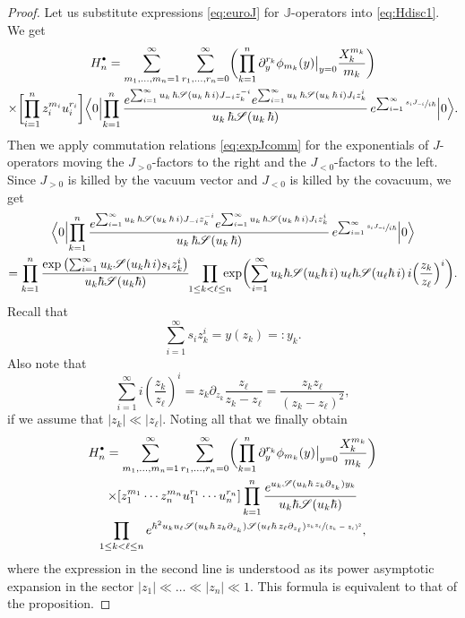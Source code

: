 \documentclass[JEP,XML,SOM,Unicode,NoEqCountersInSection,NoFloatCountersInSection]{cedram}
\let\mathcal\mathscr
\newcommand{\sbullet}{{\scriptscriptstyle\bullet}}
\newcommand{\csbullet}{{\raisebox{1pt}{$\sbullet$}}}
\theoremstyle{plain}
\theoremstyle{definition}
\theoremstyle{remark}
\newcommand{\cS}{\mathcal{S}}
\newcommand{\BVEV}[1]{{\Bigl\langle 0 \Big| {#1} \Big| 0 \Bigr\rangle}}
\newcommand{\Hd}{H^\csbullet}
\newcommand{\euro}{\mathbb{J}}
\begin{document}
\begin{proof}
Let us substitute expressions \eqref{eq:euroJ} for $\euro$-operators into \eqref{eq:Hdisc1}. We get
\begin{multline*}
\Hd_n=\sum_{m_1,\dots,m_n=1}^\infty
\sum_{r_1,\dots,r_n=0}^\infty
\biggl(\prod_{k=1}^n\partial_y^{r_k}\phi_{m_k}(y)\big|_{y=0}\frac{X_k^{m_k}}{m_k}\biggr)
\\
\times\biggl[\prod_{i=1}^n z_i^{m_i}u_i^{r_i}\biggr]
\BVEV{\prod_{k=1}^n\dfrac{
e^{\sum_{i=1}^\infty u_k\,\hbar\cS(u_k\,\hbar\,i) J_{-i}z_k^{-i}}
e^{\sum_{i=1}^\infty u_k\,\hbar \cS(u_k\,\hbar\,i) J_{i}z_k^{i}}}
{u_k\,\hbar\cS(u_k\,\hbar)}\,
e^{\sum_{i=1}^\infty \sfrac{s_i J_{-i}}{i\hbar} }
}.
\end{multline*}
Then we apply commutation relations \eqref{eq:expJcomm} for the exponentials of $J$-operators moving the $J_{>0}$-factors to the right and the $J_{<0}$-factors to the left. Since $J_{>0}$ is killed by the vacuum vector and $J_{<0}$ is killed by the covacuum, we get
\begin{multline*}
\BVEV{\prod_{k=1}^n\dfrac{
e^{\sum_{i=1}^\infty u_k\,\hbar\cS(u_k\,\hbar\,i) J_{-i}z_k^{-i}}
e^{\sum_{i=1}^\infty u_k\,\hbar \cS(u_k\,\hbar\,i) J_{i}z_k^{i}}}
{u_k\,\hbar\cS(u_k\,\hbar)}\,
e^{\sum_{i=1}^\infty \sfrac{s_i J_{-i}}{i\hbar} }}
\\
= \prod_{k=1}^n \dfrac{\exp\left(\sum_{i=1}^\infty u_k\cS(u_k\hbar\,i)s_iz_k^i \right)}
{u_k\hbar\cS(u_k\hbar)}\hspace*{-1mm}
\prod_{1\le k<\ell\le n}\hspace*{-3mm}
\exp\biggl(\sum_{i=1}^\infty u_k\hbar\cS(u_k\hbar\,i)\,u_\ell\hbar\cS(u_\ell\hbar\,i)
\,i\Bigl(\dfrac{z_k}{z_\ell}\Bigr)^i \biggr).
\end{multline*}
Recall that
\[
\sum_{i=1}^\infty s_i z_k^i=y(z_k)=:y_k.
\]
Also note that
\[
\label{eq:bergexp}
\sum_{i=1}^\infty i\left(\dfrac{z_k}{z_\ell}\right)^i
=z_k\partial_{z_k}\frac{z_\ell}{z_k-z_\ell}=\frac{z_kz_\ell}{(z_k-z_\ell)^2},
\]
if we assume that $|z_k| \ll |z_\ell|$. Noting all that we finally obtain
\begin{multline*}
\Hd_n=\sum_{m_1,\dots,m_n=1}^\infty
\sum_{r_1,\dots,r_n=0}^\infty
\biggl(\prod_{k=1}^n\partial_y^{r_k}\phi_{m_k}(y)\big|_{y=0}\frac{X_k^{m_k}}{m_k}\biggr)\\
\times[z_1^{m_1}\cdots z_n^{m_n}u_1^{r_1}\cdots u_n^{r_n}]
\prod_{k=1}^n \frac{e^{ u_k\cS(u_k\hbar\,z_k\partial_{z_k})y_k }}
{u_k\hbar\cS(u_k\hbar)}\\
\prod_{1\le k<\ell\le n}
e^{\hbar^2u_ku_\ell\cS(u_k\hbar\,z_k\partial_{z_k})\cS(u_\ell\hbar\,z_\ell\partial_{z_\ell})
\sfrac{z_k z_\ell}{(z_k-z_\ell)^2}},
\end{multline*}
where the expression in the second line is understood as its power asymptotic expansion in the sector $|z_1|\ll\dots\ll|z_n|\ll1$. This formula is equivalent to that of the proposition.
\end{proof}
\end{document}
